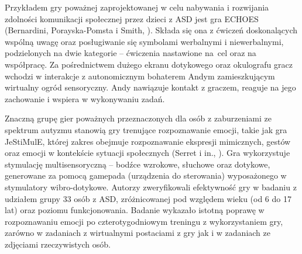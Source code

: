     Przykładem gry poważnej zaprojektowanej w celu nabywania i rozwijania zdolności komunikacji społecznej przez dzieci z ASD jest gra ECHOES (Bernardini, Porayska-Pomsta i Smith, \cite*{bernardini2014echoes}).
    Składa się ona z ćwiczeń doskonalących wspólną uwagę oraz posługiwanie się symbolami werbalnymi i niewerbalnymi, podzielonych na dwie kategorie -- ćwiczenia nastawione na~cel oraz na współpracę.
    Za pośrednictwem dużego ekranu dotykowego oraz okulografu gracz wchodzi w interakcje z autonomicznym bohaterem Andym zamieszkującym wirtualny ogród sensoryczny.
    Andy nawiązuje kontakt z graczem, reaguje na jego zachowanie i wspiera w wykonywaniu zadań.

    Znaczną grupę gier poważnych przeznaczonych dla osób z zaburzeniami ze spektrum autyzmu stanowią gry trenujące rozpoznawanie emocji, takie jak gra JeStiMulE, której zakres obejmuje rozpoznawanie ekspresji mimicznych, gestów oraz emocji w kontekście sytuacji społecznych (Serret i in., \cite*{serret2014facing}).
    Gra wykorzystuje stymulację multisensoryczną -- bodźce wzrokowe, słuchowe oraz dotykowe, generowane za pomocą gamepada (urządzenia do sterowania) wyposażonego w stymulatory wibro-dotykowe.
    Autorzy zweryfikowali efektywność gry w badaniu z udziałem grupy 33 osób z ASD, zróżnicowanej pod względem wieku (od 6 do 17 lat) oraz poziomu funkcjonowania.
    Badanie wykazało istotną poprawę w rozpoznawaniu emocji po czterotygodniowym treningu z wykorzystaniem gry, zarówno w zadaniach z wirtualnymi postaciami z gry jak i w zadaniach ze zdjęciami rzeczywistych osób.
    